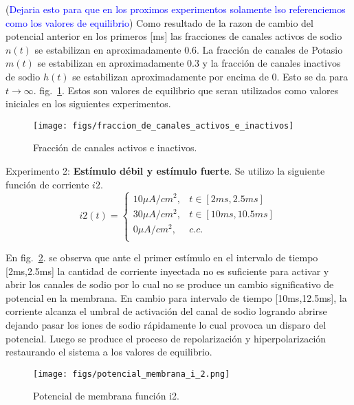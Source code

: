 \documentclass[aps,prl,twocolumn,groupedaddress]{revtex4-2}
\begin{document}
(\textcolor{blue}{Dejaria esto para que en los proximos experimentos solamente lso referenciemos como los valores de equilibrio})
Como resultado de la razon de cambio del potencial anterior en los primeros [ms] las fracciones de canales activos de sodio $n(t)$ se estabilizan en aproximadamente 0.6. La fracción de canales de Potasio $m(t)$ se estabilizan en aproximadamente 0.3 y la fracción de canales inactivos de sodio $h(t)$ se estabilizan aproximadamente por encima de 0. Esto se da para ${t \to \infty}$. fig.~\ref{fig2}. Estos son valores de equilibrio que seran utilizados como valores iniciales en los siguientes experimentos.\\


\begin{figure}[h!]
\centering
\texttt{[image: figs/fraccion\_de\_canales\_activos\_e\_inactivos]}
\caption{Fracción de canales activos e inactivos. \label{fig2}}
\end{figure}


Experimento 2: \textbf{Estímulo débil y estímulo fuerte}. Se utilizo la siguiente función de corriente $i2$.\\
$$
i2(t) = \left\{
\begin{array}{ll}
10 \mu A/cm^2, & t\in [2ms,2.5ms] \\
30 \mu A/cm^2, & t\in [10ms,10.5ms] \\
0 \mu A/cm^2, & c.c. \\
\end{array}
\right.
$$

En fig.~\ref{fig3}. se observa que ante el primer estímulo en el intervalo de tiempo [2ms,2.5ms] la cantidad de corriente inyectada no es suficiente para activar y abrir los canales de sodio por lo cual no se produce un cambio significativo de potencial en la membrana. En cambio para intervalo de tiempo [10ms,12.5ms], la corriente alcanza el umbral de activación del canal de sodio logrando abrirse dejando pasar los iones de sodio rápidamente lo cual provoca un disparo del potencial. Luego se produce el proceso de repolarización y hiperpolarización  restaurando el sistema a los valores de equilibrio.\\


\begin{figure}[h!]
\centering
\texttt{[image: figs/potencial\_membrana\_i\_2.png]}
\caption{Potencial de membrana función i2. \label{fig3}}
\end{figure}
\end{document}
